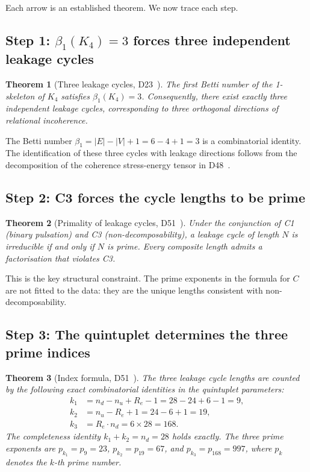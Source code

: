 \documentclass[12pt,a4paper]{article}
\theoremstyle{plain}
\newtheorem{theorem}{Theorem}[section]
\theoremstyle{definition}
\theoremstyle{remark}
\newcommand{\Kfour}{K_4}
\renewcommand{\Re}{R_e}
\newcommand{\pk}[1]{p_{#1}}
\begin{document}
Each arrow is an established theorem. We now trace each step.

\subsection{Step 1: \texorpdfstring{$\beta_1(\Kfour) = 3$}{beta1(K4) = 3} forces three independent leakage cycles}
\label{subsec:beta1}

\begin{theorem}[Three leakage cycles, D23~\cite{PDL_D23_2026}]
\label{thm:beta1}
The first Betti number of the 1-skeleton of $\Kfour$ satisfies $\beta_1(\Kfour) = 3$. Consequently, there exist exactly three independent leakage cycles, corresponding to three orthogonal directions of relational incoherence.
\end{theorem}

The Betti number $\beta_1 = |E| - |V| + 1 = 6 - 4 + 1 = 3$ is a combinatorial identity. The identification of these three cycles with leakage directions follows from the decomposition of the coherence stress-energy tensor in D48~\cite{PDL_D48_2026}.

\subsection{Step 2: C3 forces the cycle lengths to be prime}
\label{subsec:primes}

\begin{theorem}[Primality of leakage cycles, D51~\cite{PDL_D51_2026}]
\label{thm:prime}
Under the conjunction of C1 (binary pulsation) and C3 (non-decomposability), a leakage cycle of length $N$ is irreducible if and only if $N$ is prime. Every composite length admits a factorisation that violates C3.
\end{theorem}

This is the key structural constraint. The prime exponents in the formula for $C$ are not fitted to the data: they are the unique lengths consistent with non-decomposability.

\subsection{Step 3: The quintuplet determines the three prime indices}
\label{subsec:indices}

\begin{theorem}[Index formula, D51~\cite{PDL_D51_2026}]
\label{thm:indices}
The three leakage cycle lengths are counted by the following exact combinatorial identities in the quintuplet parameters:
\begin{align}
k_1 &= n_d - n_u + \Re - 1 = 28 - 24 + 6 - 1 = 9, \label{eq:k1}\\
k_2 &= n_u - \Re + 1 = 24 - 6 + 1 = 19, \label{eq:k2}\\
k_3 &= \Re \cdot n_d = 6 \times 28 = 168. \label{eq:k3}
\end{align}
The completeness identity $k_1 + k_2 = n_d = 28$ holds exactly. The three prime exponents are $\pk{k_1} = p_9 = 23$, $\pk{k_2} = p_{19} = 67$, and $\pk{k_3} = p_{168} = 997$, where $\pk{k}$ denotes the $k$-th prime number.
\end{theorem}
\end{document}
